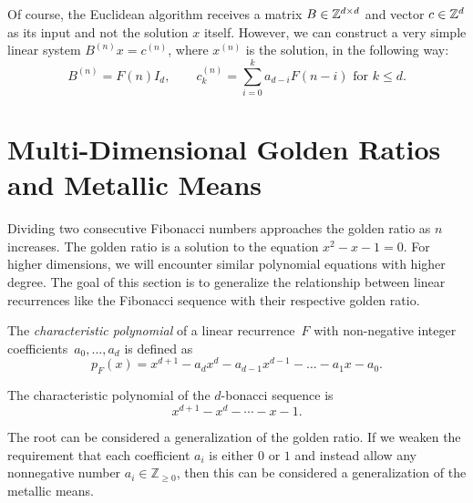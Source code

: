 Of course, the Euclidean algorithm receives a matrix $B \in {\mathbb Z}^{d \times d}$
and vector $c \in {\mathbb Z}^d$ as its input and not the solution $x$ itself.
However, we can construct a very simple linear system $B^{(n)} x = c^{(n)}$,
where $x^{(n)}$ is the solution, in the following way:
\[
  B^{(n)} = F(n) I_d, \qquad c^{(n)}_k = \sum_{i=0}^k a_{d-i} F(n - i) \text{ for } k ≤ d.
\]

\section{Multi-Dimensional Golden Ratios and Metallic Means}

Dividing two consecutive Fibonacci numbers approaches the golden ratio as $n$ increases.
The golden ratio is a solution to the equation $x^2 - x - 1 = 0$.
For higher dimensions, we will encounter similar polynomial equations with higher degree.
The goal of this section is to generalize the relationship between linear
recurrences like the Fibonacci sequence with their respective golden ratio.

\begin{definition}
  The \emph{characteristic polynomial} of a linear recurrence~$F$ with
  non-negative integer coefficients~$a_0, \dots, a_d$ is defined as
  \[
    p_F(x) = x^{d+1} - a_d x^d - a_{d-1} x^{d-1} - \dots - a_1 x - a_0.
  \]
\end{definition}


\begin{example}
  The characteristic polynomial of the $d$-bonacci sequence is
  \[
    x^{d+1} - x^d - ⋯ - x - 1.
  \]
\end{example}

The root can be considered a generalization of the golden ratio.
If we weaken the requirement that each coefficient $a_i$ is either $0$ or $1$ and
instead allow any nonnegative number $a_i ∈ ℤ_{≥ 0}$, then this can be considered a
generalization of the metallic means.

